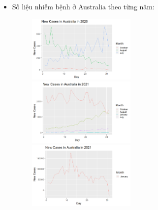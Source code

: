 \documentclass[a4paper]{article}
\theoremstyle{definition}
\begin{document}
\begin{enumerate}[i)]
\begin{enumerate}[1]
    \begin{itemize}
    \item{Số liệu nhiễm bệnh ở Australia theo từng năm:}
    \vspace{5cm}
    \begin{figure}[hpt!]
    \includegraphics[width=0.5\textwidth]{Images/1.1v.png}
    \includegraphics[width=0.5\textwidth]{Images/1.2v.png}
    \includegraphics[width=0.5\textwidth]{Images/1.3v.png}
    \end{figure}
    \end{itemize}
    

\end{enumerate}
\end{enumerate}
\end{document}
